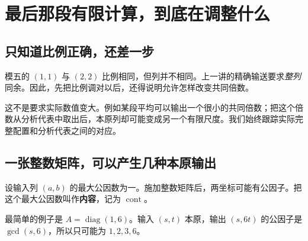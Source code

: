 \documentclass[11pt,a4paper,oneside,openany]{book}
\newcommand{\diag}{\operatorname{diag}}
\newcommand{\cont}{\operatorname{cont}}
\theoremstyle{definition}
\numberwithin{equation}{chapter}
\begin{document}
\chapter{最后那段有限计算，到底在调整什么}\label{sec:controllers}
\section{只知道比例正确，还差一步}
模五的 $(1,1)$ 与 $(2,2)$ 比例相同，但列并不相同。上一讲的精确输送要求\emph{整列}同余。因此，先把比例调对以后，还得说明允许怎样改变共同倍数。

这不是要求实际数值变大。例如某段平均可以输出一个很小的共同倍数；把这个倍数从分析代表中取出后，本原列却可能变成另一个有限尺度。我们始终跟踪实际完整配置和分析代表之间的对应。

\section{一张整数矩阵，可以产生几种本原输出}
设输入列 $(a,b)$ 的最大公因数为一。施加整数矩阵后，两坐标可能有公因子。把这个最大公因数叫作\textbf{内容}，记为 $\cont$。

最简单的例子是 $A=\diag(1,6)$。输入 $(s,t)$ 本原，输出 $(s,6t)$ 的公因子是 $\gcd(s,6)$，所以只可能为 $1,2,3,6$。
\end{document}
